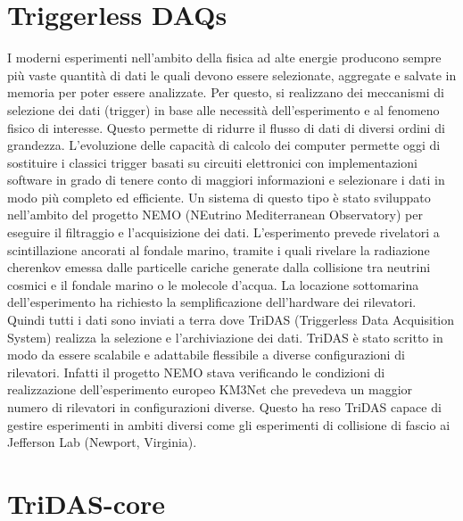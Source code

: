 \documentclass[../main.tex]{subfiles}
\begin{document}
\section{Triggerless DAQs}

I moderni esperimenti nell'ambito della fisica ad alte energie producono sempre più vaste quantità di dati le quali devono essere selezionate, aggregate e salvate in memoria per poter essere analizzate.  
Per questo, si realizzano dei meccanismi di selezione dei dati (trigger) in base alle necessità dell'esperimento e al fenomeno fisico di interesse. Questo permette di ridurre il flusso di dati di diversi ordini di grandezza. L'evoluzione delle capacità di calcolo dei computer permette oggi di sostituire i classici trigger basati su circuiti elettronici con implementazioni software in grado di tenere conto di maggiori informazioni e selezionare i dati in modo più completo ed efficiente.  
Un sistema di questo tipo è stato sviluppato nell'ambito del progetto NEMO (NEutrino Mediterranean Observatory) per eseguire il filtraggio e l'acquisizione dei dati. L'esperimento prevede rivelatori a scintillazione ancorati al fondale marino, tramite i quali rivelare la radiazione cherenkov emessa dalle particelle cariche generate dalla collisione tra neutrini cosmici e il fondale marino o le molecole d'acqua. La locazione sottomarina dell'esperimento ha richiesto la semplificazione dell'hardware dei rilevatori. Quindi tutti i dati sono inviati a terra dove TriDAS (Triggerless Data Acquisition System) realizza la selezione e l'archiviazione dei dati.
TriDAS è stato scritto in modo da essere scalabile e adattabile flessibile a diverse configurazioni di rilevatori. Infatti il progetto NEMO stava verificando le condizioni di realizzazione dell'esperimento europeo KM3Net che prevedeva un maggior numero di rilevatori in configurazioni diverse. Questo ha reso TriDAS capace di gestire esperimenti in ambiti diversi come gli esperimenti di collisione di fascio ai Jefferson Lab (Newport, Virginia).




\section{TriDAS-core}
\end{document}
